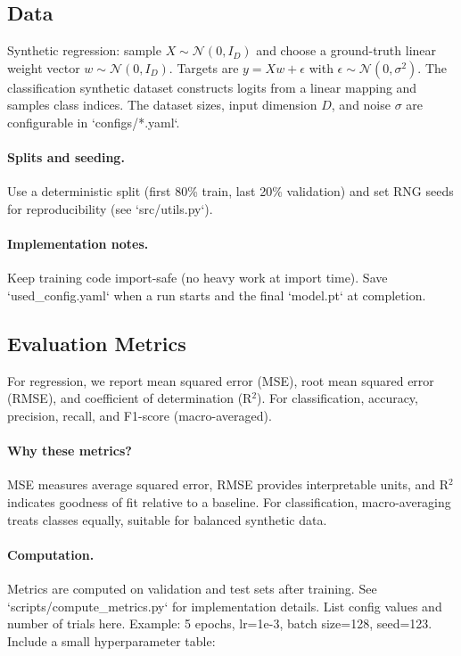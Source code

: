 \documentclass[11pt]{article}
\begin{document}
\subsection{Data}
Synthetic regression: sample $X\sim\mathcal{N}(0,I_D)$ and choose a ground-truth linear weight vector $w\sim\mathcal{N}(0,I_D)$. Targets are $y=Xw+\epsilon$ with $\epsilon\sim\mathcal{N}(0,\sigma^2)$. The classification synthetic dataset constructs logits from a linear mapping and samples class indices. The dataset sizes, input dimension $D$, and noise $\sigma$ are configurable in `configs/*.yaml`.

\paragraph{Splits and seeding.} Use a deterministic split (first 80\% train, last 20\% validation) and set RNG seeds for reproducibility (see `src/utils.py`).

\paragraph{Implementation notes.} Keep training code import-safe (no heavy work at import time). Save `used_config.yaml` when a run starts and the final `model.pt` at completion.

\subsection{Evaluation Metrics}
For regression, we report mean squared error (MSE), root mean squared error (RMSE), and coefficient of determination (R$^2$). For classification, accuracy, precision, recall, and F1-score (macro-averaged).

\paragraph{Why these metrics?} MSE measures average squared error, RMSE provides interpretable units, and R$^2$ indicates goodness of fit relative to a baseline. For classification, macro-averaging treats classes equally, suitable for balanced synthetic data.

\paragraph{Computation.} Metrics are computed on validation and test sets after training. See `scripts/compute_metrics.py` for implementation details.
List config values and number of trials here. Example: 5 epochs, lr=1e-3, batch size=128, seed=123. Include a small hyperparameter table:
\end{document}
